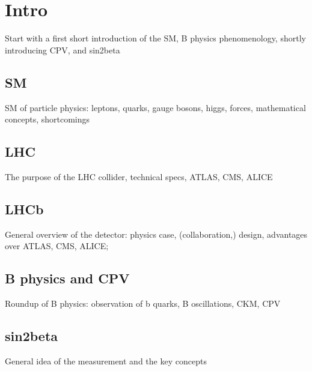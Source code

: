 
\chapter{Intro}
Start with a first short introduction of the SM, B physics phenomenology, shortly introducing CPV, and sin2beta

\section{SM}
SM of particle physics: leptons, quarks, gauge bosons, higgs, forces, mathematical concepts, shortcomings 

\section{LHC}
The purpose of the LHC collider, technical specs, ATLAS, CMS, ALICE

\section{LHCb}
General overview of the detector: physics case, (collaboration,) design, advantages over ATLAS, CMS, ALICE; 

\section{B physics and CPV}
Roundup of B physics: observation of b quarks, B oscillations, CKM, CPV

\section{sin2beta}
General idea of the measurement and the key concepts
